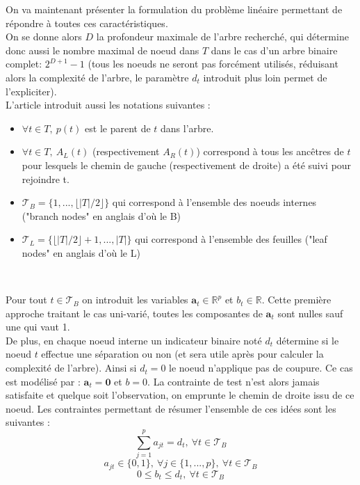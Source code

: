 \documentclass[12pt]{report}
\begin{document}
On va maintenant présenter la formulation du problème linéaire permettant de répondre à toutes ces caractéristiques.\\
On se donne alors \(D\) la profondeur maximale de l'arbre recherché, qui détermine donc aussi le nombre maximal de noeud dans \(T\) dans le cas d'un arbre binaire complet: \(2^{D+1}-1\) (tous les noeuds ne seront pas forcément utilisés, réduisant alors la complexité de l'arbre, le paramètre \(d_t\) introduit plus loin permet de l'expliciter).\\
L'article introduit aussi les notations suivantes :
\begin{itemize}
    \item \( \forall t \in T, ~ p(t)\) est le parent de \(t\) dans l'arbre.
    \item \( \forall t \in T, ~ A_L(t)\) (respectivement \(A_R(t)\)) correspond à tous les ancêtres de \(t\) pour lesquels le chemin de gauche (respectivement de droite) a été suivi pour rejoindre t.
    \item \(\mathcal{T}_B=\{1,...,\lfloor |T|/2\rfloor\}\) qui correspond à l'ensemble des noeuds internes ("branch nodes" en anglais d'où le B)
    \item \(\mathcal{T}_L=\{\lfloor |T|/2\rfloor+1,...,|T|\}\) qui correspond à l'ensemble des feuilles ("leaf nodes" en anglais d'où le L)
\end{itemize}
\\
\vspace{0.5cm}

Pour tout \(t \in \mathcal{T}_B\) on introduit les variables \(\mathbf{a}_t \in \mathbb{R}^p\) et \(b_t \in \mathbb{R}\). Cette première approche traitant le cas uni-varié, toutes les composantes de \(\mathbf{a}_t\) sont nulles sauf une qui vaut 1.\\
De plus, en chaque noeud interne un indicateur binaire noté \(d_t\) détermine si le noeud \(t\) effectue une séparation ou non (et sera utile après pour calculer la complexité de l'arbre). Ainsi si \(d_t=0\) le noeud n'applique pas de coupure. Ce cas est modélisé par : \(\mathbf{a}_t=\mathbf{0}\) et \(b=0\). La contrainte de test n'est alors jamais satisfaite et quelque soit l'observation, on emprunte le chemin de droite issu de ce noeud. Les contraintes permettant de résumer l'ensemble de ces idées sont les suivantes :
\begin{equation}
     \sum_{j=1}^p a_{jt}=d_t,~ \forall t \in \mathcal{T}_B 
\end{equation}
\begin{equation}
     a_{jt} \in \{0,1\},~ \forall j \in \{1,...,p\},~ \forall t \in \mathcal{T}_B 
\end{equation}
\begin{equation}
     0 \leq b_t \leq d_t,~ \forall t \in \mathcal{T}_B 
\end{equation}
\end{document}
